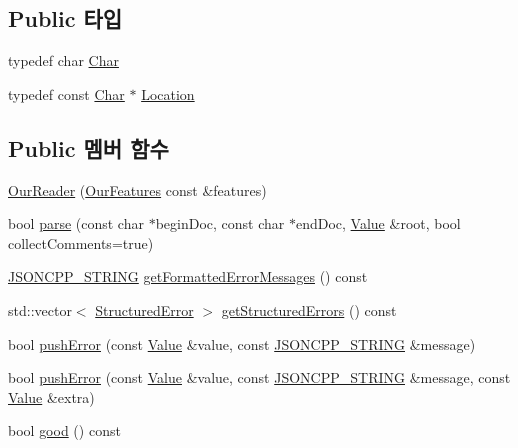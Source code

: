 \subsection*{Public 타입}
\begin{DoxyCompactItemize}
\item 
typedef char \hyperlink{class_json_1_1_our_reader_a0cd0bab4caa66594ab843ccd5f9dc239}{Char}
\item 
typedef const \hyperlink{class_json_1_1_our_reader_a0cd0bab4caa66594ab843ccd5f9dc239}{Char} $\ast$ \hyperlink{class_json_1_1_our_reader_a1bdc7bbc52ba87cae6b19746f2ee0189}{Location}
\end{DoxyCompactItemize}
\subsection*{Public 멤버 함수}
\begin{DoxyCompactItemize}
\item 
\hyperlink{class_json_1_1_our_reader_a48a850914b9c8d7781be172930c478e5}{Our\+Reader} (\hyperlink{class_json_1_1_our_features}{Our\+Features} const \&features)
\item 
bool \hyperlink{class_json_1_1_our_reader_aba4f8749aab7f02ec17f107e392caf80}{parse} (const char $\ast$begin\+Doc, const char $\ast$end\+Doc, \hyperlink{class_json_1_1_value}{Value} \&root, bool collect\+Comments=true)
\item 
\hyperlink{json_8h_a1e723f95759de062585bc4a8fd3fa4be}{J\+S\+O\+N\+C\+P\+P\+\_\+\+S\+T\+R\+I\+NG} \hyperlink{class_json_1_1_our_reader_a7971de51d73bb4aee5b0c4742c4aaaac}{get\+Formatted\+Error\+Messages} () const
\item 
std\+::vector$<$ \hyperlink{struct_json_1_1_our_reader_1_1_structured_error}{Structured\+Error} $>$ \hyperlink{class_json_1_1_our_reader_a0eb2420a6bef89a3f3256191e6e3de6d}{get\+Structured\+Errors} () const
\item 
bool \hyperlink{class_json_1_1_our_reader_a700e9d8e0977fa7e0375d26690d7025f}{push\+Error} (const \hyperlink{class_json_1_1_value}{Value} \&value, const \hyperlink{json_8h_a1e723f95759de062585bc4a8fd3fa4be}{J\+S\+O\+N\+C\+P\+P\+\_\+\+S\+T\+R\+I\+NG} \&message)
\item 
bool \hyperlink{class_json_1_1_our_reader_addccecfca74b79adaad6115ddd614477}{push\+Error} (const \hyperlink{class_json_1_1_value}{Value} \&value, const \hyperlink{json_8h_a1e723f95759de062585bc4a8fd3fa4be}{J\+S\+O\+N\+C\+P\+P\+\_\+\+S\+T\+R\+I\+NG} \&message, const \hyperlink{class_json_1_1_value}{Value} \&extra)
\item 
bool \hyperlink{class_json_1_1_our_reader_a63c7d874fa379397e0a5fa65f0843845}{good} () const
\end{DoxyCompactItemize}
